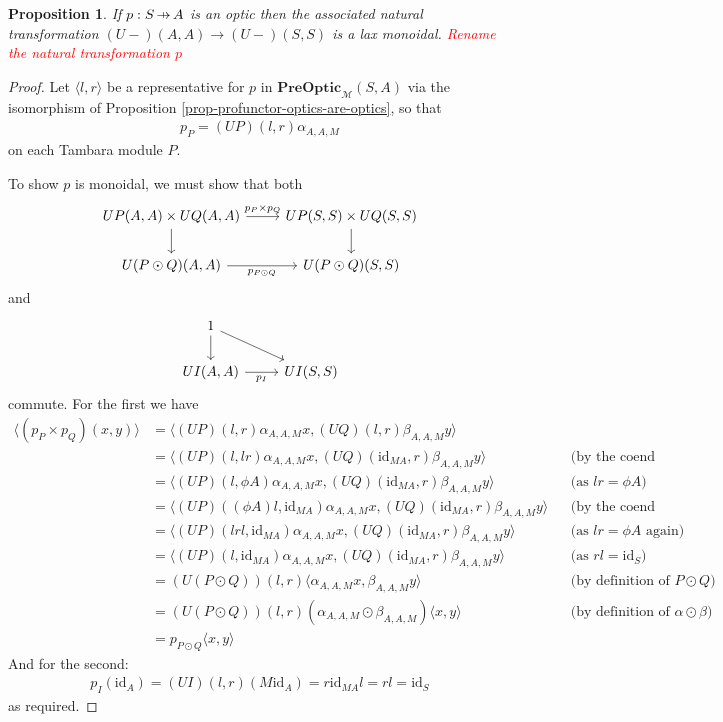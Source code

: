 \documentclass[11pt,a4paper]{article}
\theoremstyle{plain}
\newtheorem{proposition}[theorem]{Proposition}
\theoremstyle{definition}
\newcommand{\M}{\mathscr{M}}
\newcommand{\PreOptic}{\mathbf{PreOptic}}
\newcommand{\id}{\mathrm{id}}
\newcommand{\hto}{\ensuremath{\,\mathaccent\shortmid\rightarrow\,}}
\newcommand{\todo}[1]{\textcolor{red}{\small #1}}
\begin{document}
\begin{proposition}
If $p : S \hto A$ is an optic then the associated natural transformation $(U-)(A,A) \to (U-)(S,S)$ is a lax monoidal. \todo{Rename the natural transformation $p$}
\end{proposition}
\begin{proof}
Let $\langle l, r \rangle$ be a representative for $p$ in $\PreOptic_\M(S,A)$ via the isomorphism of Proposition \ref{prop-profunctor-optics-are-optics}, so that
\begin{align*}
p_P = (UP)(l,r) \alpha_{A,A,M}
\end{align*}
on each Tambara module $P$.

To show $p$ is monoidal, we must show that both
\[
\begin{tikzcd}
UP(A,A) \times UQ(A,A) \ar[r, "p_P \times p_Q"] \ar[d, swap] & UP(S, S) \times UQ(S, S)  \ar[d] \\
U(P \odot Q)(A,A)  \ar[r, "p_{P \odot Q}", swap] & U(P \odot Q)(S,S)
\end{tikzcd}
\]
and
\[
\begin{tikzcd}
1 \ar[d] \ar[dr] & \\
UI(A,A)  \ar[r, "p_I", swap] & UI(S,S)
\end{tikzcd}
\]
commute. For the first we have
\begin{align*}
\langle (p_P \times p_Q)(x, y) \rangle &= \langle (UP)(l,r) \alpha_{A,A,M} x,  (UQ)(l,r) \beta_{A,A,M} y\rangle \\
&= \langle (UP)(l,lr) \alpha_{A,A,M} x, (UQ)(\id_{MA},r) \beta_{A,A,M} y\rangle && \text{(by the coend relations)} \\
&= \langle (UP)(l,\phi A) \alpha_{A,A,M} x, (UQ)(\id_{MA},r) \beta_{A,A,M} y\rangle && \text{(as $lr = \phi A$)} \\
&= \langle (UP)((\phi A)l,\id_{MA}) \alpha_{A,A,M} x, (UQ)(\id_{MA},r) \beta_{A,A,M} y\rangle && \text{(by the coend relations again)} \\
&= \langle (UP)(lrl,\id_{MA}) \alpha_{A,A,M} x, (UQ)(\id_{MA},r) \beta_{A,A,M} y\rangle && \text{(as $lr = \phi A$ again)} \\
&= \langle (UP)(l,\id_{MA}) \alpha_{A,A,M} x, (UQ)(\id_{MA},r) \beta_{A,A,M} y\rangle && \text{(as $rl = \id_S$)} \\
&= (U(P \odot Q))(l,r) \langle \alpha_{A,A,M} x, \beta_{A,A,M} y \rangle && \text{(by definition of $P \odot Q$)} \\
&= (U(P \odot Q))(l,r) (\alpha_{A,A,M} \odot \beta_{A,A,M}) \langle x, y \rangle && \text{(by definition of $\alpha \odot \beta$)} \\
&= p_{P \odot Q} \langle x, y \rangle
\end{align*}
And for the second:
\begin{align*}
p_I(\id_A) = (UI)(l,r) (M \id_A) = r \id_{MA} l = rl = \id_S
\end{align*}
as required.
\end{proof}
\end{document}
